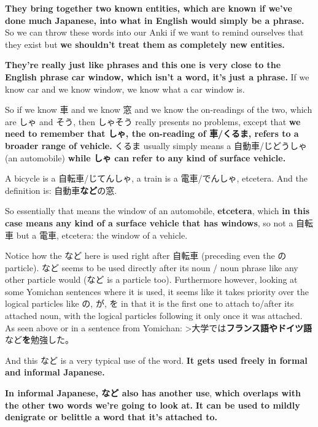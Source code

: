 {}

{\bf They bring together two known entities, which are known if we've done much Japanese, into what in English would simply be a phrase.} So we can throw these words into our Anki if we want to remind ourselves that they exist but {\bf we shouldn't treat them as completely new entities.}

{\bf They're really just like phrases and this one is very close to the English phrase car window, which isn't a word, it's just a phrase.} If we know car and we know window, we know what a car window is.

So if we know 車 and we know 窓 and we know the on-readings of the two, which are しゃ and そう, then しゃそう really presents no problems, except that {\bf we need to remember that しゃ, the on-reading of 車/くるま, refers to a broader range of vehicle.} くるま usually simply means a 自動車/じどうしゃ (an automobile) {\bf while しゃ can refer to any kind of surface vehicle.}

A bicycle is a 自転車/じてんしゃ, a train is a 電車/でんしゃ, etcetera. And the definition is: 自動車{\bf など}の窓.

So essentially that means the window of an automobile, {\bf etcetera}, which {\bf in this case means any kind of a surface vehicle that has windows}, so not a 自転車 but a 電車, etcetera: the window of a vehicle.

Notice how the など here is used right after 自転車 (preceding even the の particle).\crlf
など seems to be used directly after its noun / noun phrase like any other particle would (など is a particle too). Furthermore however, looking at some Yomichan sentences where it is used, it seems like it takes priority over the logical particles like の, が, を in that it is the first one to attach to/after its attached noun, with the logical particles following it only once it was attached. As seen above or in a sentence from Yomichan: >大学では{\bf フランス語やドイツ語}など{\bf を}勉強した。

And this など is a very typical use of the word.\crlf
{\bf It gets used freely in formal and informal Japanese.}

\startsectionlevel[title={など in informal Japanese},reference={など-in-informal-japanese}]

{\bf In informal Japanese, など also has another use}, {\bf which overlaps with the other two words we're going to look at.} {\bf It can be used to mildly denigrate or belittle a word that it's attached to.}

